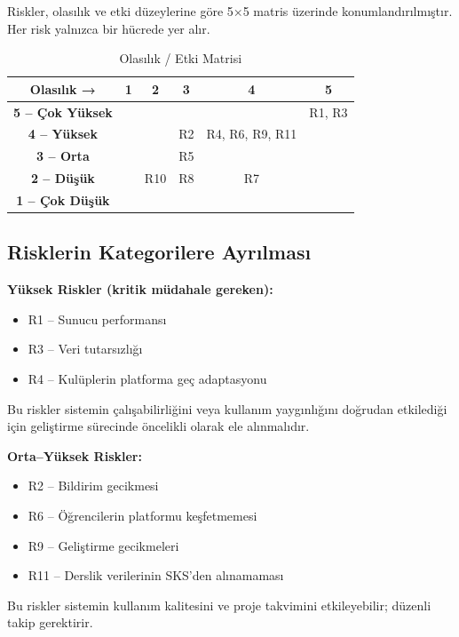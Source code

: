 \documentclass[a4paper,12pt]{report}
\begin{document}
Riskler, olasılık ve etki düzeylerine göre 5×5 matris üzerinde konumlandırılmıştır. Her risk yalnızca bir hücrede yer alır.

\begin{table}[H]
\centering
\caption{Olasılık / Etki Matrisi}
\begin{tabular}{c c c c c c}
\toprule
\textbf{Olasılık →} & \textbf{1} & \textbf{2} & \textbf{3} & \textbf{4} & \textbf{5} \\
\midrule
\textbf{5 – Çok Yüksek} &  &  &  &  & R1, R3 \\
\textbf{4 – Yüksek} &  &  & R2 & R4, R6, R9, R11 &  \\
\textbf{3 – Orta} &  &  & R5 &  &  \\
\textbf{2 – Düşük} &  & R10 & R8 & R7 &  \\
\textbf{1 – Çok Düşük} &  &  &  &  &  \\
\bottomrule
\end{tabular}
\end{table}

\subsection{Risklerin Kategorilere Ayrılması}

\textbf{Yüksek Riskler (kritik müdahale gereken):}
\begin{itemize}
    \item R1 – Sunucu performansı
    \item R3 – Veri tutarsızlığı
    \item R4 – Kulüplerin platforma geç adaptasyonu
\end{itemize}

Bu riskler sistemin çalışabilirliğini veya kullanım yaygınlığını doğrudan etkilediği için geliştirme sürecinde öncelikli olarak ele alınmalıdır.

\textbf{Orta–Yüksek Riskler:}
\begin{itemize}
    \item R2 – Bildirim gecikmesi
    \item R6 – Öğrencilerin platformu keşfetmemesi
    \item R9 – Geliştirme gecikmeleri
    \item R11 – Derslik verilerinin SKS'den alınamaması
\end{itemize}

Bu riskler sistemin kullanım kalitesini ve proje takvimini etkileyebilir; düzenli takip gerektirir.
\end{document}
